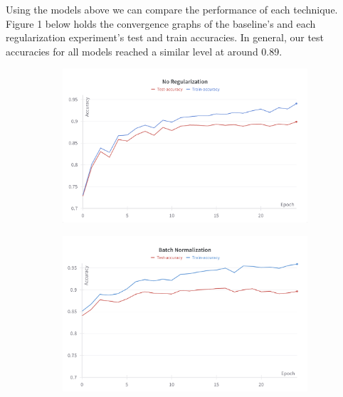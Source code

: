 \documentclass{article}
\begin{document}
\newpage
Using the models above we can compare the performance of each technique. Figure 1 below holds the convergence graphs of the baseline's and each regularization experiment's test and train accuracies. In general, our test accuracies for all models reached a similar level at around 0.89.


\begin{figure}[ht] %
    \centering

    \caption{Convergence Graphs of Models}
    \label{fig:Convergence}

    \begin{subfigure}[b]{0.45\textwidth}
        \centering
        \includegraphics[width=\linewidth]{../src/no_reg.png}
    \end{subfigure}
    \hfill
    \begin{subfigure}[b]{0.45\textwidth}
        \centering
        \includegraphics[width=\linewidth]{../src/batch_norm.png}
    \end{subfigure}
    

\end{figure}
\end{document}
